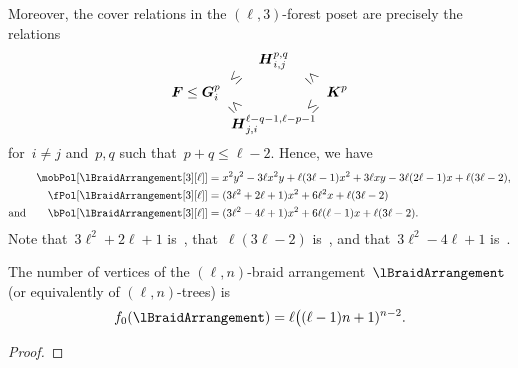 \begin{example}
Moreover, the cover relations in the $(\ell,3)$-forest poset are precisely the relations
\[
\b{F} \le \b{G}_i^p \begin{array}{c@{\hspace{-.3cm}}c@{\hspace{-.3cm}}c} & \b{H}_{i,j}^{p,q} & \\ \rotatebox[origin=c]{45}{$\le$} & & \rotatebox[origin=c]{-45}{$\le$} \\[.3cm] \rotatebox[origin=c]{-45}{$\le$} & & \rotatebox[origin=c]{45}{$\le$} \\ & \b{H}_{j,i}^{\ell-q-1, \ell-p-1} & \end{array} \b{K}^p
\]
for~$i \ne j$ and~$p, q$ such that~$p + q \le \ell-2$.
Hence, we have
\begin{align*}
\mobPol[{\lBraidArrangement[3][\ell]}] & = x^2 y^2 - 3 \ell x^2 y + \ell (3 \ell - 1) x^2 + 3 \ell x y - 3 \ell (2 \ell - 1) x + \ell (3 \ell - 2) , \\
\fPol[{\lBraidArrangement[3][\ell]}] & = (3 \ell^2 + 2 \ell + 1) x^2 + 6 \ell^2 x + \ell (3 \ell - 2) \\
\text{and}\qquad
\bPol[{\lBraidArrangement[3][\ell]}] & = (3 \ell^2 - 4 \ell + 1) x^2 + 6 \ell (\ell - 1) x + \ell (3 \ell - 2).
\end{align*}
Note that~$3 \ell^2 + 2 \ell + 1$ is~, that~$\ell (3 \ell - 2)$ is~, and that~$3 \ell^2 - 4 \ell + 1$ is~.
\end{example}

\begin{theorem}
\label{thm:verticeslnBraidArrangement}
The number of vertices of the $(\ell,n)$-braid arrangement~$\lBraidArrangement$ (or equivalently of $(\ell,n)$-trees) is
\[
f_0(\lBraidArrangement) = \ell \big( (\ell-1) n + 1)^{n-2}.
\]
\end{theorem}

\begin{proof}
\end{proof}

\begin{theorem}
\label{thm:verticesRefinedlnBraidArrangement}
\end{theorem}

